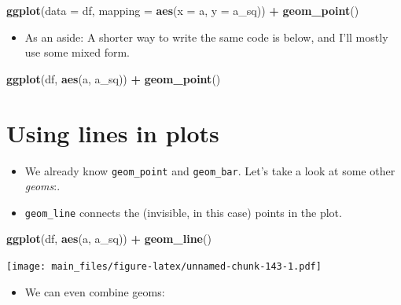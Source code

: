 \documentclass[
]{book}
\newenvironment{Shaded}{\begin{snugshade}}{\end{snugshade}}
\newcommand{\AttributeTok}[1]{\textcolor[rgb]{0.13,0.29,0.53}{#1}}
\newcommand{\FunctionTok}[1]{\textcolor[rgb]{0.13,0.29,0.53}{\textbf{#1}}}
\newcommand{\NormalTok}[1]{#1}
\newcommand{\SpecialCharTok}[1]{\textcolor[rgb]{0.81,0.36,0.00}{\textbf{#1}}}
\providecommand{\tightlist}{%
  \setlength{\itemsep}{0pt}\setlength{\parskip}{0pt}}
\begin{document}
\begin{Shaded}
\begin{Highlighting}[]
\FunctionTok{ggplot}\NormalTok{(}\AttributeTok{data =}\NormalTok{ df, }\AttributeTok{mapping =} \FunctionTok{aes}\NormalTok{(}\AttributeTok{x =}\NormalTok{ a, }\AttributeTok{y =}\NormalTok{ a\_sq)) }\SpecialCharTok{+} \FunctionTok{geom\_point}\NormalTok{()}
\end{Highlighting}
\end{Shaded}

\begin{itemize}
\tightlist
\item
  As an aside: A shorter way to write the same code is below, and I'll mostly use some mixed form.
\end{itemize}

\begin{Shaded}
\begin{Highlighting}[]
\FunctionTok{ggplot}\NormalTok{(df, }\FunctionTok{aes}\NormalTok{(a, a\_sq)) }\SpecialCharTok{+} \FunctionTok{geom\_point}\NormalTok{()}
\end{Highlighting}
\end{Shaded}

\section{Using lines in plots}\label{using-lines-in-plots}

\begin{itemize}
\item
  We already know \texttt{geom\_point} and \texttt{geom\_bar}. Let's take a look at some other \emph{geoms}:.
\item
  \texttt{geom\_line} connects the (invisible, in this case) points in the plot.
\end{itemize}

\begin{Shaded}
\begin{Highlighting}[]
\FunctionTok{ggplot}\NormalTok{(df, }\FunctionTok{aes}\NormalTok{(a, a\_sq)) }\SpecialCharTok{+} \FunctionTok{geom\_line}\NormalTok{()}
\end{Highlighting}
\end{Shaded}

\texttt{[image: main\_files/figure-latex/unnamed-chunk-143-1.pdf]}

\begin{itemize}
\tightlist
\item
  We can even combine geoms:
\end{itemize}
\end{document}
